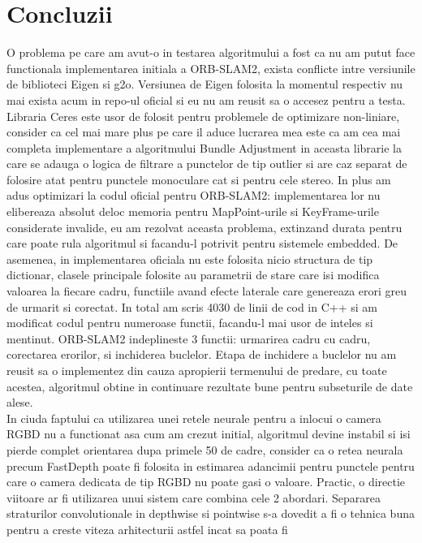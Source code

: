 \documentclass[12pt,a4paper]{report}
\begin{document}
\chapter{Concluzii}
O problema pe care am avut-o in testarea algoritmului a fost ca nu am putut face 
functionala implementarea initiala a ORB-SLAM2, exista conflicte intre versiunile de
biblioteci Eigen si g2o. Versiunea de Eigen folosita la momentul respectiv nu mai 
exista acum in repo-ul oficial si eu nu am reusit sa o accesez pentru a testa.\\ 
Libraria Ceres este usor de folosit pentru problemele de optimizare non-liniare, 
consider ca cel mai mare plus pe care il aduce lucrarea mea este ca am cea mai 
completa implementare a algoritmului Bundle Adjustment in aceasta librarie la 
care se adauga o logica de filtrare a punctelor de tip outlier si are caz 
separat de folosire atat pentru punctele monoculare cat si pentru cele stereo.   
In plus am adus optimizari la codul oficial pentru ORB-SLAM2: implementarea lor 
nu elibereaza absolut deloc memoria pentru MapPoint-urile si KeyFrame-urile 
considerate invalide, eu am rezolvat aceasta problema, extinzand durata pentru 
care poate rula algoritmul si facandu-l potrivit pentru sistemele embedded.
De asemenea, in implementarea oficiala nu este folosita nicio structura de tip
dictionar, clasele principale folosite au parametrii de stare care isi modifica
valoarea la fiecare cadru, functiile avand efecte laterale care genereaza erori 
greu de urmarit si corectat. In total am scris 4030 de linii de cod in C++ si 
am modificat codul pentru numeroase functii, facandu-l mai usor de inteles si 
mentinut. ORB-SLAM2 indeplineste 3 functii: urmarirea cadru cu cadru, corectarea 
erorilor, si inchiderea buclelor. Etapa de inchidere a buclelor nu am reusit sa o 
implementez din cauza apropierii termenului de predare, cu toate acestea, algoritmul
obtine in continuare rezultate bune pentru subseturile de date alese. \\
In ciuda faptului ca utilizarea unei retele neurale pentru a inlocui o camera 
RGBD nu a functionat asa cum am crezut initial, algoritmul devine instabil si 
isi pierde complet orientarea dupa primele 50 de cadre, consider ca o retea 
neurala precum FastDepth poate fi folosita in estimarea adancimii pentru 
punctele pentru care o camera dedicata de tip RGBD nu poate gasi o valoare.
Practic, o directie viitoare ar fi utilizarea unui sistem care combina cele 2 
abordari. Separarea straturilor convolutionale in depthwise si pointwise s-a dovedit
a fi o tehnica buna pentru a creste viteza arhitecturii astfel incat sa poata fi
\end{document}
